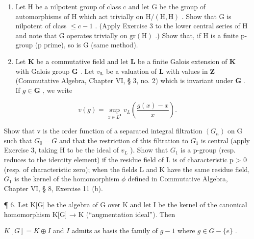\begin{enumerate}
\def\labelenumi{\arabic{enumi}.}
\setcounter{enumi}{3}
\item
  Let H be a nilpotent group of class c and let G be the group of automorphisms of H which act trivially on \(\mathrm{H}/(\mathrm{H},\mathrm{H})\) . Show that G is nilpotent of class \(\leqslant c - 1\) . (Apply Exercise 3 to the lower central series of H and note that G operates trivially on \(\mathrm{gr}(\mathrm{H})\) .) Show that, if H is a finite p-group (p prime), so is G (same method).
\item
  Let \(\mathbf{K}\) be a commutative field and let \(\mathbf{L}\) be a finite Galois extension of \(\mathbf{K}\) with Galois group \(\mathbf{G}\) . Let \(v_{\mathbf{L}}\) be a valuation of \(\mathbf{L}\) with values in \(\mathbf{Z}\) (Commutative Algebra, Chapter VI, § 3, no. 2) which is invariant under \(\mathbf{G}\) . If \(g \in \mathbf{G}\) , we write
\end{enumerate}

\[
v (g) = \sup _ {x \in L ^ {\bullet}} v _ {L} \left(\frac {g (x) - x}{x}\right).
\]

Show that v is the order function of a separated integral filtration \((G_{n})\) on G such that \(G_{0} = G\) and that the restriction of this filtration to \(G_{1}\) is central (apply Exercise 3, taking H to be the ideal of \(v_{L}\) ). Show that \(G_{1}\) is a p-group (resp. reduces to the identity element) if the residue field of L is of characteristic p \textgreater{} 0 (resp. of characteristic zero); when the fields L and K have the same residue field, \(G_{1}\) is the kernel of the homomorphism \(\phi\) defined in Commutative Algebra, Chapter VI, § 8, Exercise 11 (b).

¶ 6. Let K{[}G{]} be the algebra of G over K and let I be the kernel of the canonical homomorphism K{[}G{]} → K (``augmentation ideal''). Then


\(K[G] = K \oplus I\) and \(I\) admits as basis the family of \(g - 1\) where \(g \in G - \{e\}\) .

